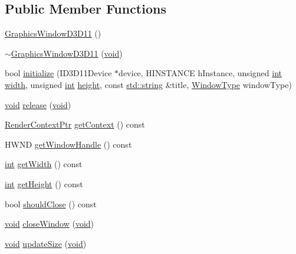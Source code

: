 \subsection*{Public Member Functions}
\begin{DoxyCompactItemize}
\item 
\hyperlink{class_a_c_t_k_1_1_graphics_window_d3_d11_a2a3528cf349e02338565bc70d17a86ee}{Graphics\-Window\-D3\-D11} ()
\item 
\hyperlink{class_a_c_t_k_1_1_graphics_window_d3_d11_a338b35eb640677b53edd4e985524bd07}{$\sim$\-Graphics\-Window\-D3\-D11} (\hyperlink{wglew_8h_aeea6e3dfae3acf232096f57d2d57f084}{void})
\item 
bool \hyperlink{class_a_c_t_k_1_1_graphics_window_d3_d11_a7943c9299e3e3e607015b1b5fd019e82}{initialize} (I\-D3\-D11\-Device $\ast$device, H\-I\-N\-S\-T\-A\-N\-C\-E h\-Instance, unsigned \hyperlink{wglew_8h_a500a82aecba06f4550f6849b8099ca21}{int} \hyperlink{glew_8h_aa105b18f96e6bc2485cb7f576a7fb9ba}{width}, unsigned \hyperlink{wglew_8h_a500a82aecba06f4550f6849b8099ca21}{int} \hyperlink{glew_8h_aa214bd63e12f7ddf524c83894fcc69a7}{height}, const \hyperlink{glew_8h_ae9ea2d206f76ea82db7a2ea002fdef2f}{std\-::string} \&title, \hyperlink{namespace_a_c_t_k_a5cb71db6f350f73a1acaf41781bffb5b}{Window\-Type} window\-Type)
\item 
\hyperlink{wglew_8h_aeea6e3dfae3acf232096f57d2d57f084}{void} \hyperlink{class_a_c_t_k_1_1_graphics_window_d3_d11_a5d32ac909aedf447ca478ce51b30f216}{release} (\hyperlink{wglew_8h_aeea6e3dfae3acf232096f57d2d57f084}{void})
\item 
\hyperlink{namespace_a_c_t_k_a7030f603b6015e2f7c08ab1cc584d084}{Render\-Context\-Ptr} \hyperlink{class_a_c_t_k_1_1_graphics_window_d3_d11_a3111859e372a8f9a89aa6d1c2a0bb35c}{get\-Context} () const 
\item 
H\-W\-N\-D \hyperlink{class_a_c_t_k_1_1_graphics_window_d3_d11_a895c115929f8c385597eab2f63a2b035}{get\-Window\-Handle} () const 
\item 
\hyperlink{wglew_8h_a500a82aecba06f4550f6849b8099ca21}{int} \hyperlink{class_a_c_t_k_1_1_graphics_window_d3_d11_a0ee64fcd0d8914469b22439656fa9af5}{get\-Width} () const 
\item 
\hyperlink{wglew_8h_a500a82aecba06f4550f6849b8099ca21}{int} \hyperlink{class_a_c_t_k_1_1_graphics_window_d3_d11_ab988ec3a852359b540d7cd966d911cdb}{get\-Height} () const 
\item 
bool \hyperlink{class_a_c_t_k_1_1_graphics_window_d3_d11_a57313bd7d9a0b8dc55da19b8210db87c}{should\-Close} () const 
\item 
\hyperlink{wglew_8h_aeea6e3dfae3acf232096f57d2d57f084}{void} \hyperlink{class_a_c_t_k_1_1_graphics_window_d3_d11_ac53bbc9b2549b79df12ebf619b7bcc59}{close\-Window} (\hyperlink{wglew_8h_aeea6e3dfae3acf232096f57d2d57f084}{void})
\item 
\hyperlink{wglew_8h_aeea6e3dfae3acf232096f57d2d57f084}{void} \hyperlink{class_a_c_t_k_1_1_graphics_window_d3_d11_a0edeb9feb7e3afca6ccda5b5d799d115}{update\-Size} (\hyperlink{wglew_8h_aeea6e3dfae3acf232096f57d2d57f084}{void})
\end{DoxyCompactItemize}


